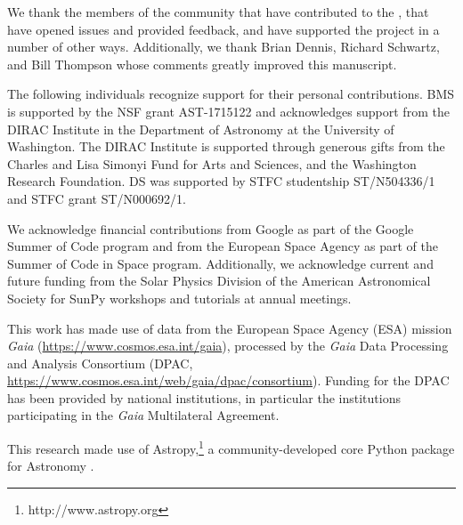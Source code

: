 \acknowledgments

We thank the members of the community that have contributed to the \sunpyproj, that have opened issues and provided feedback, and have supported the project in a number of other ways.
Additionally, we thank Brian Dennis, Richard Schwartz, and Bill Thompson whose comments greatly improved this manuscript.

The following individuals recognize support for their personal contributions.
BMS is supported by the NSF grant AST-1715122 and acknowledges support from the DIRAC Institute in the Department of Astronomy at the University of Washington.
The DIRAC Institute is supported through generous gifts from the Charles and Lisa Simonyi Fund for Arts and Sciences, and the Washington Research Foundation.
DS was supported by STFC studentship ST/N504336/1 and STFC grant ST/N000692/1.

We acknowledge financial contributions from Google as part of the Google Summer of Code program and from the European Space Agency as part of the Summer of Code in Space program.
Additionally, we acknowledge current and future funding from the Solar Physics Division of the American Astronomical Society for SunPy workshops and tutorials at annual meetings.

This work has made use of data from the European Space Agency (ESA) mission {\it Gaia} (\url{https://www.cosmos.esa.int/gaia}), processed by the {\it Gaia} Data Processing and Analysis Consortium (DPAC, \url{https://www.cosmos.esa.int/web/gaia/dpac/consortium}).
Funding for the DPAC has been provided by national institutions, in particular the institutions participating in the {\it Gaia} Multilateral Agreement.

This research made use of Astropy,\footnote{http://www.astropy.org} a community-developed core Python package for Astronomy \citep{astropy2013, astropy2018}.

